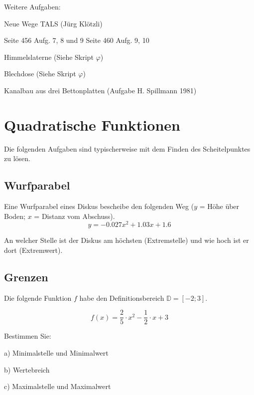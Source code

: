 



\renewcommand{\metaHeaderLine}{Extremwertaufgaben}
\renewcommand{\arbeitsblattTitel}{Extremwertaufgaben}


\arbeitsblattHeader{}



Weitere Aufgaben:

Neue Wege TALS (Jürg Klötzli)

Seite 456 Aufg. 7, 8 und 9
Seite 460 Aufg. 9, 10

Himmelslaterne (Siehe Skript $\varphi$)

Blechdose (Siehe Skript $\varphi$)

Kanalbau aus drei Bettonplatten (Aufgabe H. Spillmann 1981)


\newpage

\section{Quadratische Funktionen}
Die folgenden Aufgaben sind typischerweise mit dem Finden des
Scheitelpunktes zu lösen.

\subsection{Wurfparabel}
Eine Wurfparabel eines Diskus bescheibe den folgenden Weg ($y$ = Höhe über Boden;
$x$ = Distanz vom Abschuss).
$$y =-0.027 x^2 + 1.03x + 1.6$$

An welcher Stelle ist der Diskus am höchsten (Extremstelle) und wie
hoch ist er dort (Extremwert).

\subsection{Grenzen}
Die folgende Funktion $f$ habe den Definitionsbereich
$\mathbb{D}=[-2;3]$.

$$f(x) = \frac25\cdot{}x^2 - \frac12\cdot{}x + 3$$

Bestimmen Sie:

a) Minimalstelle und Minimalwert

b) Wertebreich

c) Maximalstelle und Maximalwert

